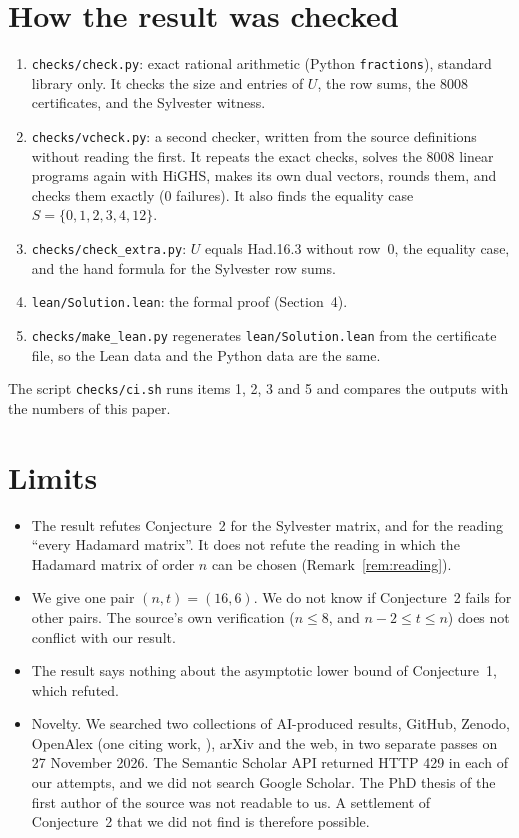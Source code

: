 \documentclass[11pt]{article}
\theoremstyle{remark}
\begin{document}
\section{How the result was checked}

\begin{enumerate}
\item \texttt{checks/check.py}: exact rational arithmetic (Python \texttt{fractions}),
standard library only. It checks the size and entries of $U$, the row sums, the 8008
certificates, and the Sylvester witness.
\item \texttt{checks/vcheck.py}: a second checker, written from the source definitions
without reading the first. It repeats the exact checks, solves the 8008 linear programs
again with HiGHS, makes its own dual vectors, rounds them, and checks them exactly (0
failures). It also finds the equality case $S=\{0,1,2,3,4,12\}$.
\item \texttt{checks/check\_extra.py}: $U$ equals Had.16.3 \cite{sloane} without row~0, the
equality case, and the hand formula for the Sylvester row sums.
\item \texttt{lean/Solution.lean}: the formal proof (Section~4).
\item \texttt{checks/make\_lean.py} regenerates \texttt{lean/Solution.lean} from the
certificate file, so the Lean data and the Python data are the same.
\end{enumerate}
The script \texttt{checks/ci.sh} runs items 1, 2, 3 and 5 and compares the outputs with
the numbers of this paper.

\section{Limits}\label{sec:limits}

\begin{itemize}
\item The result refutes Conjecture~2 for the Sylvester matrix, and for the reading ``every
Hadamard matrix''. It does not refute the reading in which the Hadamard matrix of order $n$
can be chosen (Remark~\ref{rem:reading}).
\item We give one pair $(n,t)=(16,6)$. We do not know if Conjecture~2 fails for other
pairs. The source's own verification ($n\le8$, and $n-2\le t\le n$) does not conflict with
our result.
\item The result says nothing about the asymptotic lower bound of Conjecture~1, which
\cite{gronlund2019} refuted.
\item Novelty. We searched two collections of AI-produced results, GitHub, Zenodo,
OpenAlex (one citing work, \cite{gronlund2019}), arXiv and the web, in two separate passes
on 27 November 2026. The Semantic Scholar API
returned HTTP 429 in each of our attempts, and we did not search Google Scholar. The PhD
thesis of the first author of the source was not readable to us. A settlement of
Conjecture~2 that we did not find is therefore possible.
\end{itemize}
\end{document}
